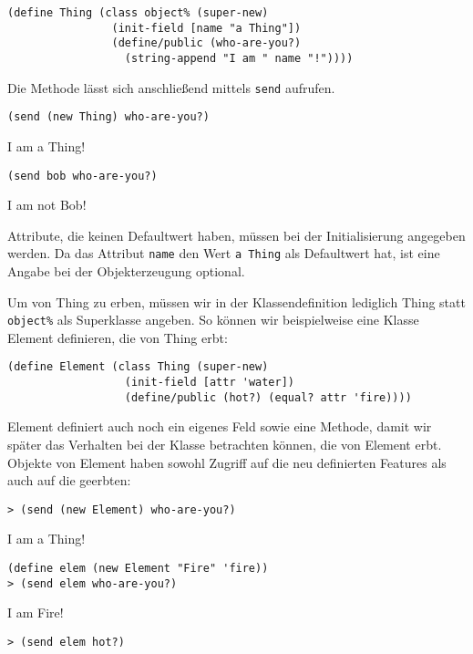\begin{lstlisting}
(define Thing (class object% (super-new)
                (init-field [name "a Thing"])
                (define/public (who-are-you?) 
                  (string-append "I am " name "!"))))
\end{lstlisting}

Die Methode lässt sich anschließend mittels \texttt{send} aufrufen.

\begin{lstlisting}
(send (new Thing) who-are-you?)
\end{lstlisting}
{\routput {\qq}I am a Thing!{\qq}}

\begin{lstlisting}
(send bob who-are-you?)
\end{lstlisting}
{\routput {\qq}I am not Bob!{\qq}}

Attribute, die keinen Defaultwert haben, müssen bei der Initialisierung angegeben werden. Da das Attribut \texttt{name} den Wert  \texttt{{\qq}a Thing{\qq}} als Defaultwert hat, ist eine Angabe bei der Objekterzeugung optional. 

Um von Thing zu erben, müssen wir in der Klassendefinition lediglich Thing statt \texttt{object\%} als Superklasse angeben. So können wir beispielweise eine Klasse Element definieren, die von Thing erbt:

\begin{lstlisting}
(define Element (class Thing (super-new)
                  (init-field [attr 'water])
                  (define/public (hot?) (equal? attr 'fire))))
\end{lstlisting}

Element definiert auch noch ein eigenes Feld sowie eine Methode, damit wir später das Verhalten bei der Klasse betrachten können, die von Element erbt. Objekte von Element haben sowohl Zugriff auf die neu definierten Features als auch auf die geerbten:

\begin{lstlisting}
> (send (new Element) who-are-you?)
\end{lstlisting}
{\routput {\qq}I am a Thing!\qq}

\begin{lstlisting}
(define elem (new Element "Fire" 'fire))
> (send elem who-are-you?)
\end{lstlisting} 
{\routput {\qq}I am Fire!\qq}
\begin{lstlisting}
> (send elem hot?)
\end{lstlisting} 
{}

